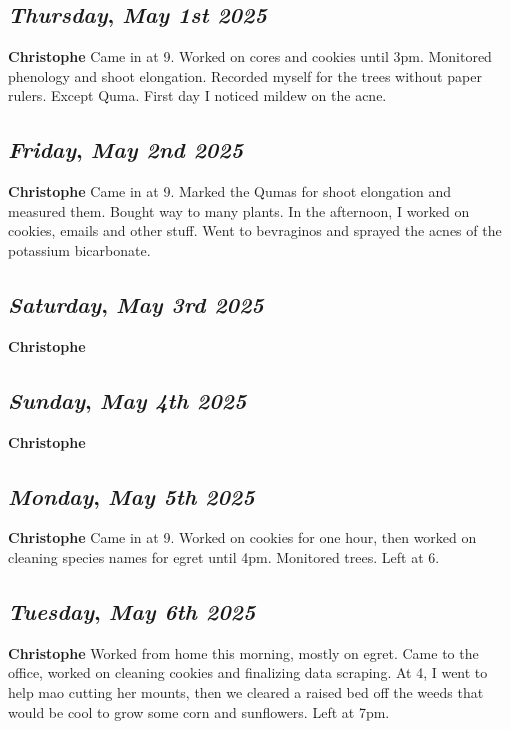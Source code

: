 \begin{center}
\section*{\month}
\end{center}

\def\day{\textit{May 1st 2025}}
\def\weekday{\textit{Thursday}}
\subsection*{\weekday, \day}
\textbf {Christophe}
Came in at 9. Worked on cores and cookies until 3pm. Monitored phenology and shoot elongation. Recorded myself for the trees without paper rulers. Except Quma. First day I noticed mildew on the acne. 

\def\day{\textit{May 2nd 2025}}
\def\weekday{\textit{Friday}}
\subsection*{\weekday, \day}
\textbf {Christophe}
Came in at 9. Marked the Qumas for shoot elongation and measured them. Bought way to many plants. In the afternoon, I worked on cookies, emails and other stuff. Went to bevraginos and sprayed the acnes of the potassium bicarbonate. 

\def\day{\textit{May 3rd 2025}}
\def\weekday{\textit{Saturday}}
\subsection*{\weekday, \day}
\textbf {Christophe}

\def\day{\textit{May 4th 2025}}
\def\weekday{\textit{Sunday}}
\subsection*{\weekday, \day}
\textbf {Christophe}

\def\day{\textit{May 5th 2025}}
\def\weekday{\textit{Monday}}
\subsection*{\weekday, \day}
\textbf {Christophe}
Came in at 9. Worked on cookies for one hour, then worked on cleaning species names for egret until 4pm. Monitored trees. Left at 6.

\def\day{\textit{May 6th 2025}}
\def\weekday{\textit{Tuesday}}
\subsection*{\weekday, \day}
\textbf {Christophe}
Worked from home this morning, mostly on egret. Came to the office, worked on cleaning cookies and finalizing data scraping. At 4, I went to help mao cutting her mounts, then we cleared a raised bed off the weeds that would be cool to grow some corn and sunflowers. Left at 7pm.

